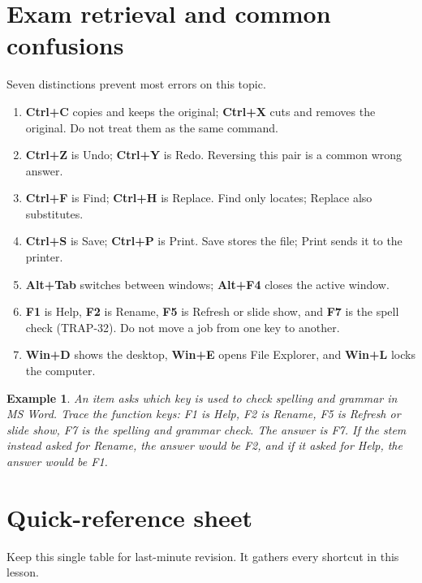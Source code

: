\documentclass[11pt]{article}
\newtheorem{example}{Example}[section]
\begin{document}
\section{Exam retrieval and common confusions}
Seven distinctions prevent most errors on this topic.
\begin{enumerate}
  \item \textbf{Ctrl+C} copies and keeps the original; \textbf{Ctrl+X} cuts and
    removes the original. Do not treat them as the same command.
  \item \textbf{Ctrl+Z} is Undo; \textbf{Ctrl+Y} is Redo. Reversing this pair
    is a common wrong answer.
  \item \textbf{Ctrl+F} is Find; \textbf{Ctrl+H} is Replace. Find only locates;
    Replace also substitutes.
  \item \textbf{Ctrl+S} is Save; \textbf{Ctrl+P} is Print. Save stores the
    file; Print sends it to the printer.
  \item \textbf{Alt+Tab} switches between windows; \textbf{Alt+F4} closes the
    active window.
  \item \textbf{F1} is Help, \textbf{F2} is Rename, \textbf{F5} is Refresh or
    slide show, and \textbf{F7} is the spell check (TRAP-32). Do not move a
    job from one key to another.
  \item \textbf{Win+D} shows the desktop, \textbf{Win+E} opens File Explorer,
    and \textbf{Win+L} locks the computer.
\end{enumerate}

\begin{example}
An item asks which key is used to check spelling and grammar in MS Word. Trace
the function keys: F1 is Help, F2 is Rename, F5 is Refresh or slide show, F7 is
the spelling and grammar check. The answer is F7. If the stem instead asked for
Rename, the answer would be F2, and if it asked for Help, the answer would be
F1.
\end{example}

\section{Quick-reference sheet}
Keep this single table for last-minute revision. It gathers every shortcut in
this lesson.
\end{document}
